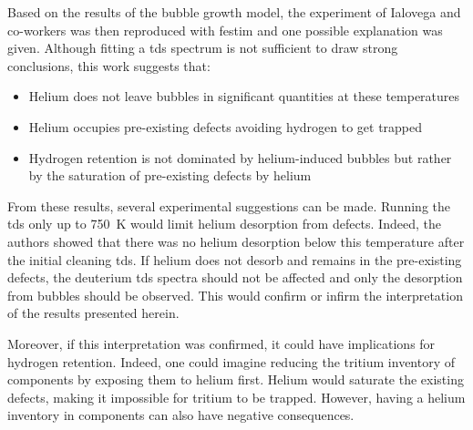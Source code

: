 Based on the results of the bubble growth model, the experiment of Ialovega and co-workers  was then reproduced with \gls{festim} and one possible explanation was given.
Although fitting a \gls{tds} spectrum is not sufficient to draw strong conclusions, this work suggests that:
\begin{itemize}
    \item Helium does not leave bubbles in significant quantities at these temperatures
    \item Helium occupies pre-existing defects avoiding hydrogen to get trapped
    \item Hydrogen retention is not dominated by helium-induced bubbles but rather by the saturation of pre-existing defects by helium
\end{itemize}

From these results, several experimental suggestions can be made.
Running the \gls{tds} only up to \SI{750}{K} would limit helium desorption from defects.
Indeed, the authors \cite{ialovega_hydrogen_2020} showed that there was no helium desorption below this temperature after the initial cleaning \gls{tds}.
If helium does not desorb and remains in the pre-existing defects, the deuterium \gls{tds} spectra should not be affected and only the desorption from bubbles should be observed.
This would confirm or infirm the interpretation of the results presented herein.

Moreover, if this interpretation was confirmed, it could have implications for hydrogen retention.
Indeed, one could imagine reducing the tritium inventory of components by exposing them to helium first.
Helium would saturate the existing defects, making it impossible for tritium to be trapped.
However, having a helium inventory in components can also have negative consequences.
